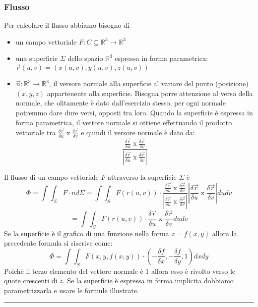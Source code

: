 \subsubsection*{Flusso}
Per calcolare il flusso abbiamo bisogno di
\begin{itemize}
    \item un campo vettoriale $F: C \subseteq \mathbb{R}^3 \rightarrow  \mathbb{R}^3$
    \item una superficie $\Sigma$ dello spazio $\mathbb{R}^3$ espressa in forma parametrica: $\vec{r}(u,v)  = (x(u,v), y(u,v), z(u,v))$
    \item $\vec{n}: \mathbb{R}^3 \rightarrow  \mathbb{R}^3$, il versore normale alla superficie al variare del punto (posizione) $(x,y,z)$ appartenente alla superficie. Bisogna porre attenzione al verso della normale, che olitamente è dato dall'esercizio stesso, per ogni normale potremmo dare dure versi, opposti tra loro. Quando la superficie è espressa in forma parametrica, il vettore normale si ottiene effettuando il prodotto vettoriale tra $\frac{\delta \vec{r}}{\delta u} \; \text{x}\;\frac{\delta \vec{r}}{\delta v}$ e quindi il versore normale è dato da:
    \[
        \frac{\frac{\delta \vec{r}}{\delta u} \; \text{x}\;\frac{\delta \vec{r}}{\delta v}}{\left|\frac{\delta \vec{r}}{\delta u} \; \text{x}\;\frac{\delta \vec{r}}{\delta v}\right|}
    \]
\end{itemize}
Il flusso di un campo vettoriale $F$ attraverso la superficie $\Sigma$ è
\[
    \Phi = \int \int_{\Sigma}F \cdot n d\Sigma = \int \int_S F(r(u,v)) \cdot \frac{\frac{\delta \vec{r}}{\delta u} \; \text{x}\;\frac{\delta \vec{r}}{\delta v}}{\left|\frac{\delta \vec{r}}{\delta u} \; \text{x}\;\frac{\delta \vec{r}}{\delta v}\right|} \left|\frac{\delta \vec{r}}{\delta u} \; \text{x}\;\frac{\delta \vec{r}}{\delta v}\right| du dv
\]
\[
    = \int \int_S F(r(u,v)) \cdot \frac{\delta \vec{r}}{\delta u} \; \text{x}\;\frac{\delta \vec{r}}{\delta v} du dv
\]
\newline
Se la superficie è il grafico di una funzione nella forma $z = f(x,y)$ allora la precedente formula si riscrive come:
\[
    \Phi = \int \int_S F(x,y,f(x,y)) \cdot \left( -\frac{\delta f}{\delta x}, -\frac{\delta f}{\delta y}, 1 \right) dx dy
\]
Poichè il terzo elemento del vettore normale è 1 allora esso è rivolto verso le quote crescenti di $z$.\newline
\newline
Se la superficie è espressa in forma implicita dobbiamo parametrizzarla e usare le formule illustrate.\newline
\rule{\textwidth}{0,4pt}
